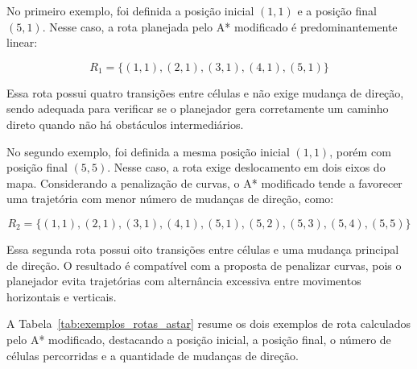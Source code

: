 \documentclass[	12pt, Times, openright, twoside, a4paper, english, brazil]{abntex2}
\begin{document}
No primeiro exemplo, foi definida a posição inicial \((1,1)\) e a posição final \((5,1)\). Nesse caso, a rota planejada pelo A* modificado é predominantemente linear:

\begin{equation}
	R_1 = \{(1,1), (2,1), (3,1), (4,1), (5,1)\}
	\label{eq:rota_astar_exemplo_1}
\end{equation}

Essa rota possui quatro transições entre células e não exige mudança de direção, sendo adequada para verificar se o planejador gera corretamente um caminho direto quando não há obstáculos intermediários.

No segundo exemplo, foi definida a mesma posição inicial \((1,1)\), porém com posição final \((5,5)\). Nesse caso, a rota exige deslocamento em dois eixos do mapa. Considerando a penalização de curvas, o A* modificado tende a favorecer uma trajetória com menor número de mudanças de direção, como:

\begin{equation}
	R_2 = \{(1,1), (2,1), (3,1), (4,1), (5,1), (5,2), (5,3), (5,4), (5,5)\}
	\label{eq:rota_astar_exemplo_2}
\end{equation}

Essa segunda rota possui oito transições entre células e uma mudança principal de direção. O resultado é compatível com a proposta de penalizar curvas, pois o planejador evita trajetórias com alternância excessiva entre movimentos horizontais e verticais.





A Tabela~\ref{tab:exemplos_rotas_astar} resume os dois exemplos de rota calculados pelo A* modificado, destacando a posição inicial, a posição final, o número de células percorridas e a quantidade de mudanças de direção.
\end{document}
